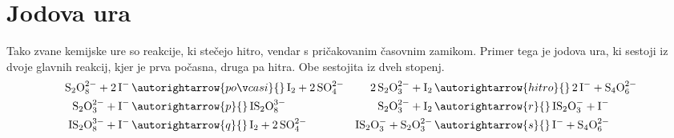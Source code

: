 \section{Jodova ura}

Tako zvane kemijske ure so reakcije, ki stečejo hitro, vendar s pričakovanim časovnim zamikom. Primer tega je jodova ura, ki sestoji iz dvoje glavnih reakcij, kjer je prva počasna, druga pa hitra. Obe sestojita iz dveh stopenj.
\begin{align}
    \text{S}_2\text{O}_8^{2-} + 2\, \text{I}^- \, &\autorightarrow{počasi}{} \, \text{I}_2 + 2\,\text{S}\text{O}_4^{2-} & 
    2\,\text{S}_2\text{O}_3^{2-} + \text{I}_2 \, &\autorightarrow{hitro}{} \, 2\,\text{I}^- + \text{S}_4\text{O}_6^{2-} \\
    \text{S}_2\text{O}_3^{2-} + \text{I}^- \, &\autorightarrow{p}{} \, \text{I}\text{S}_2\text{O}_8^{3-} & 
    \text{S}_2\text{O}_3^{2-} + \text{I}_2 \, &\autorightarrow{r}{} \, \text{I}\text{S}_2\text{O}_3^{-} + \text{I}^- \\ \nonumber
    \text{I}\text{S}_2\text{O}_8^{3-} + \text{I}^- \, &\autorightarrow{q}{} \,  \text{I}_2 + 2\,\text{S}\text{O}_4^{2-} &
    \text{I}\text{S}_2\text{O}_3^{-} + \text{S}_2\text{O}_3^{2-} \, &\autorightarrow{s}{} \, \text{I}^- + \text{S}_4\text{O}_6^{2-}
\end{align}

